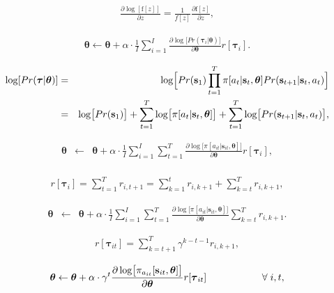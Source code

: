 \documentclass[letterpaper,twoside,openany, titlepage,oldfontcommands,titles,dvipsnames]{memoir}
\begin{document}
\begin{eqnarray}
 \frac{\partial \log[\mbox{f}[z]]}{\partial z} = \frac{1}{f[z]} \frac{\partial \mbox{f}[z]}{\partial z},
 \end{eqnarray}

\begin{eqnarray}\label{eq:reinforce_update_2}
 \boldsymbol\theta \leftarrow \boldsymbol\theta + \alpha \cdot\frac{1}{I}\sum_{i=1}^{I} \frac{\partial \log\bigl[Pr(\boldsymbol\tau_i|\boldsymbol\theta)\bigr]}{\partial \boldsymbol\theta} r[\boldsymbol\tau_i].
 \end{eqnarray}

\begin{eqnarray}
 \log[Pr(\boldsymbol\tau|\boldsymbol\theta)] &=& \log\Bigl[Pr(\mathbf{s}_{1})\prod_{t=1}^{T} \pi[a_{t}|\mathbf{s}_{t},\boldsymbol\theta] Pr(\mathbf{s}_{t+1}|\mathbf{s}_{t},a_{t})\Bigr] \\
 &=& \log\bigl[Pr(\mathbf{s}_{1})\bigr]+\sum_{t=1}^{T} \log\bigl[\pi[a_{t}|\mathbf{s}_{t},\boldsymbol\theta]\bigr] +\sum_{t=1}^{T} \log\bigl[ Pr(\mathbf{s}_{t+1}|\mathbf{s}_{t},a_{t})\bigr]\nonumber,
 \end{eqnarray}

\begin{eqnarray}
 \boldsymbol\theta \!&\!\leftarrow\!&\! \boldsymbol\theta + \alpha \cdot\frac{1}{I}\sum_{i=1}^{I} \sum_{t=1}^{T} \frac{\partial\log\bigl[\pi[a_{it}|\mathbf{s}_{it},\boldsymbol\theta]\bigr]}{\partial \boldsymbol\theta} r[\boldsymbol\tau_i],\nonumber \\
 \end{eqnarray}

\begin{eqnarray}
 r[\boldsymbol\tau_i] = \sum_{t=1}^{T} r_{i,t+1} = \sum_{k=1}^{t}r_{i,k+1} + \sum_{k=t}^{T}r_{i,k+1},
 \end{eqnarray}

\begin{eqnarray}
 \boldsymbol\theta \!&\!\leftarrow\!&\! \boldsymbol\theta + \alpha \cdot\frac{1}{I}\sum_{i=1}^{I} \sum_{t=1}^{T} \frac{\partial\log\bigl[\pi[a_{it}|\mathbf{s}_{it},\boldsymbol\theta]\bigr]}{\partial \boldsymbol\theta} \sum_{k=t}^{T} r_{i,k+1}.
 \end{eqnarray}

\begin{eqnarray}
 r[\boldsymbol\tau_{it}] = \sum_{k=t+1}^{T} \gamma^{k-t-1}r_{i,k+1},
 \end{eqnarray}

\begin{eqnarray}
 \boldsymbol\theta \leftarrow \boldsymbol\theta + \alpha \cdot \gamma^{t}\frac{\partial\log\bigl[\pi_{a_{it}}[\mathbf{s}_{it},\boldsymbol\theta]\bigr]}{\partial \boldsymbol\theta} r[\boldsymbol\tau_{it}]\hspace{2cm}\forall\hspace{1mm} i,t,
 \end{eqnarray}
\end{document}
